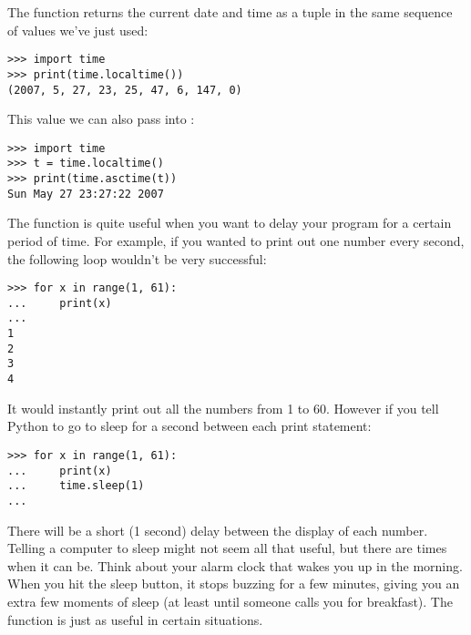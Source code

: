 \noindent
The function  returns the current date and time as a tuple in the same sequence of values we've just used:

\begin{listingignore}
\begin{verbatim}
>>> import time
>>> print(time.localtime())
(2007, 5, 27, 23, 25, 47, 6, 147, 0)
\end{verbatim}
\end{listingignore}

\noindent
This value we can also pass into :

\begin{listingignore}
\begin{verbatim}
>>> import time
>>> t = time.localtime()
>>> print(time.asctime(t))
Sun May 27 23:27:22 2007
\end{verbatim}
\end{listingignore}

\noindent
The function  is quite useful when you want to delay your program for a certain period of time.  For example, if you wanted to print out one number every second, the following loop wouldn't be very successful:

\begin{listing}
\begin{verbatim}
>>> for x in range(1, 61):
...     print(x)
...
1
2
3
4
\end{verbatim}
\end{listing}

It would instantly print out all the numbers from 1 to 60. However if you tell Python to go to sleep for a second between each print statement:

\begin{listing}
\begin{verbatim}
>>> for x in range(1, 61):
...     print(x)
...     time.sleep(1)
...
\end{verbatim}
\end{listing}

\noindent
There will be a short (1 second) delay between the display of each number. Telling a computer to sleep might not seem all that useful, but there are times when it can be.  Think about your alarm clock that wakes you up in the morning.  When you hit the sleep button, it stops buzzing for a few minutes, giving you an extra few moments of sleep (at least until someone calls you for breakfast).  The  function is just as useful in certain situations.

